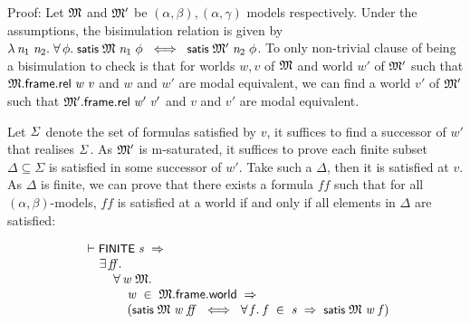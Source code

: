 \documentclass[letterpaper]{article}
\renewcommand{\HOLConst}[1]{{\textsf{\upshape\small #1}}}
\renewcommand{\HOLinline}[1]{\ensuremath{#1}}
\newenvironment{holmath}{\begin{displaymath}\begin{array}{l}}{\end{array}\end{displaymath}\ignorespacesafterend}
\begin{document}
Proof: Let \HOLinline{\HOLFreeVar{\ensuremath{\mathfrak{M}}}} and \HOLinline{\HOLFreeVar{\ensuremath{\mathfrak{M}'}}} be $(\alpha,\beta),(\alpha,\gamma)$ models respectively. Under the assumptions, the bisimulation relation is given by \HOLinline{\HOLTokenLambda{}\HOLBoundVar{n\sb{\mathrm{1}}}\;\HOLBoundVar{n\sb{\mathrm{2}}}.\;\HOLSymConst{\HOLTokenForall{}}\HOLBoundVar{\ensuremath{\phi}}.\;\HOLConst{satis}\;\HOLFreeVar{\ensuremath{\mathfrak{M}}}\;\HOLBoundVar{n\sb{\mathrm{1}}}\;\HOLBoundVar{\ensuremath{\phi}}\;\HOLSymConst{\HOLTokenEquiv{}}\;\HOLConst{satis}\;\HOLFreeVar{\ensuremath{\mathfrak{M}'}}\;\HOLBoundVar{n\sb{\mathrm{2}}}\;\HOLBoundVar{\ensuremath{\phi}}}. To only non-trivial clause of being a bisimulation to check is that for worlds $w,v$ of \HOLinline{\HOLFreeVar{\ensuremath{\mathfrak{M}}}} and world $w'$ of \HOLinline{\HOLFreeVar{\ensuremath{\mathfrak{M}'}}} such that \HOLinline{\HOLFreeVar{\ensuremath{\mathfrak{M}}}.\HOLFieldName{frame}.\HOLFieldName{rel}\;\HOLFreeVar{w}\;\HOLFreeVar{v}} and $w$ and $w'$ are modal equivalent, we can find a world $v'$ of \HOLinline{\HOLFreeVar{\ensuremath{\mathfrak{M}'}}} such that \HOLinline{\HOLFreeVar{\ensuremath{\mathfrak{M}'}}.\HOLFieldName{frame}.\HOLFieldName{rel}\;\HOLFreeVar{w\sp{\prime}}\;\HOLFreeVar{v\sp{\prime}}} and $v$ and $v'$ are modal equivalent. 

Let \HOLinline{\HOLFreeVar{\ensuremath{\Sigma}}} denote the set of formulas satisfied by $v$, it suffices to find a successor of $w'$ that realises \HOLinline{\HOLFreeVar{\ensuremath{\Sigma}}}. As \HOLinline{\HOLFreeVar{\ensuremath{\mathfrak{M}'}}} is m-saturated, it suffices to prove each finite subset $\Delta\subseteq \Sigma$ is satisfied in some successor of $w'$. Take such a $\Delta$, then it is satisfied at $v$. As $\Delta$ is finite, we can prove that there exists a formula $ff$ such that for all $(\alpha,\beta)$-models, $ff$ is satisfied at a world if and only if all elements in $\Delta$ are satisfied:

\begin{holmath}
  \ensuremath{\HOLTokenTurnstile}\HOLConst{FINITE}\;\HOLFreeVar{s}\;\HOLSymConst{\HOLTokenImp{}}\\
\;\;\;\;\;\HOLSymConst{\HOLTokenExists{}}\HOLBoundVar{ff}.\\
\;\;\;\;\;\;\;\;\;\HOLSymConst{\HOLTokenForall{}}\HOLBoundVar{w}\;\HOLBoundVar{\ensuremath{\mathfrak{M}}}.\\
\;\;\;\;\;\;\;\;\;\;\;\;\;\HOLBoundVar{w}\;\HOLSymConst{\HOLTokenIn{}}\;\HOLBoundVar{\ensuremath{\mathfrak{M}}}.\HOLFieldName{frame}.\HOLFieldName{world}\;\HOLSymConst{\HOLTokenImp{}}\\
\;\;\;\;\;\;\;\;\;\;\;\;\;(\HOLConst{satis}\;\HOLBoundVar{\ensuremath{\mathfrak{M}}}\;\HOLBoundVar{w}\;\HOLBoundVar{ff}\;\HOLSymConst{\HOLTokenEquiv{}}\;\HOLSymConst{\HOLTokenForall{}}\HOLBoundVar{f}.\;\HOLBoundVar{f}\;\HOLSymConst{\HOLTokenIn{}}\;\HOLFreeVar{s}\;\HOLSymConst{\HOLTokenImp{}}\;\HOLConst{satis}\;\HOLBoundVar{\ensuremath{\mathfrak{M}}}\;\HOLBoundVar{w}\;\HOLBoundVar{f})
\end{holmath}
\end{document}
